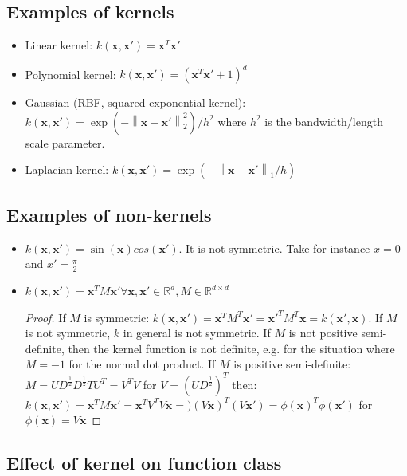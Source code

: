 \documentclass[a4paper,10pt,twoside]{article}
\newcommand\norm[1]{\left\lVert#1\right\rVert}
\begin{document}
\subsection{Examples of kernels}
\begin{itemize}
    \item Linear kernel: $k(\mathbf{x},\mathbf{x}')=\mathbf{x}^T\mathbf{x}'$
    \item Polynomial kernel: $k(\mathbf{x},\mathbf{x}')=(\mathbf{x}^T\mathbf{x}'+1)^d$
    \item Gaussian (RBF, squared exponential kernel): $k(\mathbf{x},\mathbf{x}')=\exp(-\norm{\mathbf{x}-\mathbf{x}'}_2^2)/h^2$ where $h^2$ is the bandwidth/length scale parameter.
    \item Laplacian kernel: $k(\mathbf{x},\mathbf{x}')=\exp(-\norm{\mathbf{x}-\mathbf{x}'}_1/h)$
\end{itemize}
\subsection{Examples of non-kernels}
\begin{itemize}
    \item $k(\mathbf{x},\mathbf{x}') = \sin(\mathbf{x})cos(\mathbf{x}')$. It is not symmetric. Take for instance $x=0$ and $x'=\frac{\pi}{2}$
    \item $k(\mathbf{x},\mathbf{x}') = \mathbf{x}^TM\mathbf{x}'\forall \mathbf{x},\mathbf{x}'\in\mathbb{R}^d, M\in\mathbb{R}^{d\times d}$
    \begin{proof}[Proof]
        If $M$ is symmetric: $k(\mathbf{x},\mathbf{x}')=\mathbf{x}^TM^T\mathbf{x}'= \mathbf{x}'^TM^T\mathbf{x}= k(\mathbf{x}', \mathbf{x})$. If $M$ is not symmetric, $k$ in general is not symmetric.
        If $M$ is not positive semi-definite, then the kernel function is not definite, e.g. for the situation where $M=-1$ for the normal dot product.
        If $M$ is positive semi-definite: $M=UD^{\frac{1}{2}}D^{\frac{1}{2}}TU^T=V^TV$ for $V=(UD^{\frac{1}{2}})^T$ then: $k(\mathbf{x}, \mathbf{x}')=\mathbf{x}^TM\mathbf{x}'=\mathbf{x}^TV^TV\mathbf{x}=)(V\mathbf{x})^T(V\mathbf{x}')=\phi (\mathbf{x})^T\phi (\mathbf{x'})$ for $\phi(\mathbf{x})=V\mathbf{x}$
    \end{proof}
\end{itemize}

\subsection{Effect of kernel on function class}
\end{document}
